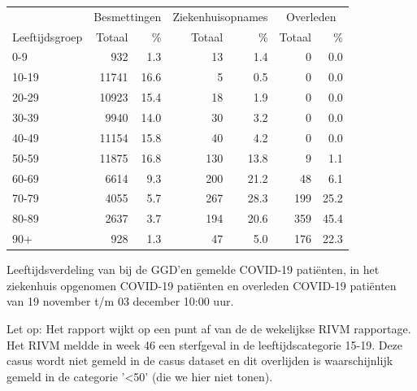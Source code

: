 \documentclass[
  english,
  man,floatsintext]{apa6}
\begin{document}
\begin{table}[H]
\centering\begingroup\fontsize{11}{13}\selectfont

\begin{threeparttable}
\begin{tabular}{lrrrrrr}
\toprule
\multicolumn{1}{c}{ } & \multicolumn{2}{c}{Besmettingen} & \multicolumn{2}{c}{Ziekenhuisopnames} & \multicolumn{2}{c}{Overleden} \\
\cmidrule(l{3pt}r{3pt}){2-3} \cmidrule(l{3pt}r{3pt}){4-5} \cmidrule(l{3pt}r{3pt}){6-7}
Leeftijdsgroep & Totaal & \% & Totaal & \% & Totaal & \%\\
\midrule
0-9 & 932 & 1.3 & 13 & 1.4 & 0 & 0.0\\
10-19 & 11741 & 16.6 & 5 & 0.5 & 0 & 0.0\\
20-29 & 10923 & 15.4 & 18 & 1.9 & 0 & 0.0\\
30-39 & 9940 & 14.0 & 30 & 3.2 & 0 & 0.0\\
40-49 & 11154 & 15.8 & 40 & 4.2 & 0 & 0.0\\
50-59 & 11875 & 16.8 & 130 & 13.8 & 9 & 1.1\\
60-69 & 6614 & 9.3 & 200 & 21.2 & 48 & 6.1\\
70-79 & 4055 & 5.7 & 267 & 28.3 & 199 & 25.2\\
80-89 & 2637 & 3.7 & 194 & 20.6 & 359 & 45.4\\
90+ & 928 & 1.3 & 47 & 5.0 & 176 & 22.3\\
\bottomrule
\end{tabular}
\begin{tablenotes}
\item[1] Leeftijdsverdeling van bij de GGD’en gemelde COVID-19 patiënten, in het ziekenhuis opgenomen COVID-19 patiënten en overleden COVID-19 patiënten van 19 november t/m 03 december 10:00 uur.
\item[2] Let op: Het rapport wijkt op een punt af van de de wekelijkse RIVM rapportage. Het RIVM meldde in week 46 een sterfgeval in de leeftijdscategorie 15-19. Deze casus wordt niet gemeld in de casus dataset en dit overlijden is waarschijnlijk gemeld in de categorie '<50' (die we hier niet tonen).
\end{tablenotes}
\end{threeparttable}
\endgroup{}
\end{table}

\newpage
\end{document}

